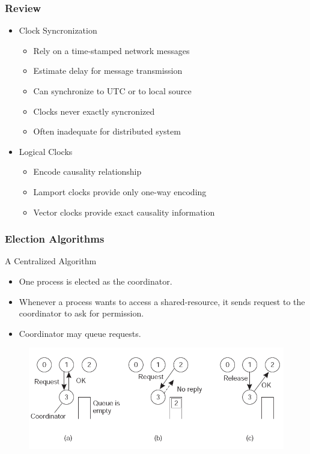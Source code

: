 \begin{frame}
    \frametitle{Review}
    \begin{itemize}
        \item Clock Syncronization
            \begin{itemize}
                \item Rely on a time-stamped network messages
                \item Estimate delay for message transmission
                \item Can synchronize to UTC or to local source
                \item Clocks never exactly syncronized
                \item Often inadequate for distributed system
            \end{itemize}
        \item Logical Clocks
            \begin{itemize}
                \item Encode causality relationship
                \item Lamport clocks provide only one-way encoding
                \item Vector clocks provide exact causality information
            \end{itemize}
    \end{itemize}
\end{frame}

\begin{frame}
    \frametitle{Election Algorithms}
A Centralized Algorithm
\begin{itemize}
    \item One process is elected as the coordinator.
    \item Whenever a process wants to access a shared-resource, it sends request to the coordinator to ask for permission.
    \item Coordinator may queue requests.
\end{itemize}
\begin{figure}
    \centering
    \includegraphics[scale=0.4]{./figures/mutual-exclusion.png}
\end{figure}

\end{frame}


